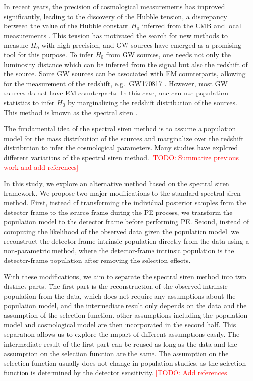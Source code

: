 \documentclass[aps,prd,twocolumn,superscriptaddress,preprintnumbers,nofootinbib,hidelinks]{revtex4-2}
\newcommand{\todo}[1]{\textcolor{red}{[TODO: #1]}}
\begin{document}
In recent years, the precision of cosmological measurements has improved significantly, leading to the discovery of the Hubble tension, a discrepancy between the value of the Hubble constant $H_0$ inferred from the \ac{CMB} \citep{Planck:2018vyg} and local measurements \citep{Riess:2021jrx}.
This tension has motivated the search for new methods to measure $H_0$ with high precision, and \ac{GW} sources have emerged as a promising tool for this purpose.
To infer $H_0$ from \ac{GW} sources, one needs not only the luminosity distance which can be inferred from the signal but also the redshift of the source.
Some \ac{GW} sources can be associated with \ac{EM} counterparts, allowing for the measurement of the redshift, e.g., GW170817 \citep{LIGOScientific:2017adf, Guidorzi:2017ogy}.
However, most \ac{GW} sources do not have \ac{EM} counterparts.
In this case, one can use population statistics to infer $H_0$ by marginalizing the redshift distribution of the sources.
This method is known as the spectral siren \citep{You:2020wju, Mastrogiovanni:2021wsd, LIGOScientific:2021aug, Ezquiaga:2022zkx}.

The fundamental idea of the spectral siren method is to assume a population model for the mass distribution of the sources and marginalize over the redshift distribution to infer the cosmological parameters.
Many studies have explored different variations of the spectral siren method.
\todo{Summarize previous work and add references}

In this study, we explore an alternative method based on the spectral siren framework.
We propose two major modifications to the standard spectral siren method.
First, instead of transforming the individual posterior samples from the detector frame to the source frame during the \ac{PE} process, we transform the population model to the detector frame before performing \ac{PE}.
Second, instead of computing the likelihood of the observed data given the population model, we reconstruct the detector-frame intrinsic population directly from the data using a non-parametric method, where the detector-frame intrinsic population is the detector-frame population after removing the selection effects.

With these modifications, we aim to separate the spectral siren method into two distinct parts.
The first part is the reconstruction of the observed intrinsic population from the data, which does not require any assumptions about the population model, and the intermediate result only depends on the data and the assumption of the selection function.
other assumptions including the population model and cosmological model are then incorporated in the second half.
This separation allows us to explore the impact of different assumptions easily.
The intermediate result of the first part can be reused as long as the data and the assumption on the selection function are the same.
The assumption on the selection function usually does not change in population studies, as the selection function is determined by the detector sensitivity.
\todo{Add references}
\end{document}
